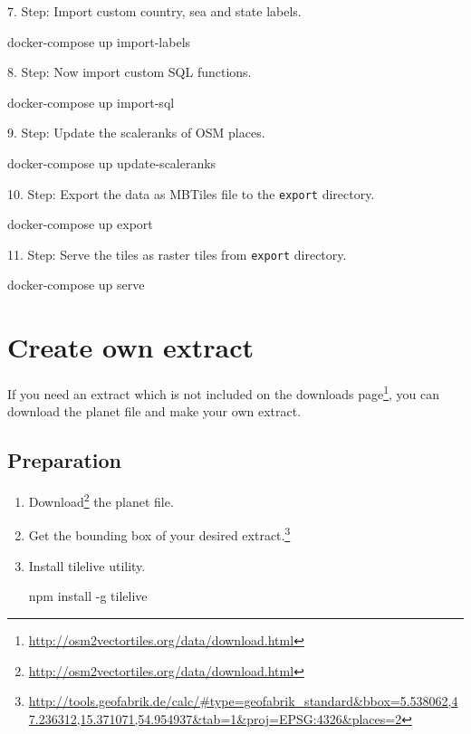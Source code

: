 7. Step: Import custom country, sea and state labels.

\begin{bashcode}
docker-compose up import-labels
\end{bashcode}

8. Step: Now import custom SQL functions.

\begin{bashcode}
docker-compose up import-sql
\end{bashcode}

9. Step: Update the scaleranks of OSM places.

\begin{bashcode}
docker-compose up update-scaleranks
\end{bashcode}

10. Step: Export the data as MBTiles file to the \texttt{export} directory.

\begin{bashcode}
docker-compose up export
\end{bashcode}

11. Step: Serve the tiles as raster tiles from \texttt{export} directory.

\begin{bashcode}
docker-compose up serve
\end{bashcode}



\section*{Create own extract}\label{create-own-extract}

If you need an extract which is not included on the
downloads page\footnote{\url{http://osm2vectortiles.org/data/download.html}},
you can download the planet file and make your own extract.

\subsection*{Preparation}

\begin{enumerate}
\item
  Download\footnote{\url{http://osm2vectortiles.org/data/download.html}} the
  planet file.
\item
  Get the bounding box of your desired extract.\footnote{\url{http://tools.geofabrik.de/calc/\#type=geofabrik_standard\&bbox=5.538062,47.236312,15.371071,54.954937\&tab=1\&proj=EPSG:4326\&places=2}}
\item
  Install tilelive utility.

\begin{bashcode}
npm install -g tilelive
\end{bashcode}
\end{enumerate}

